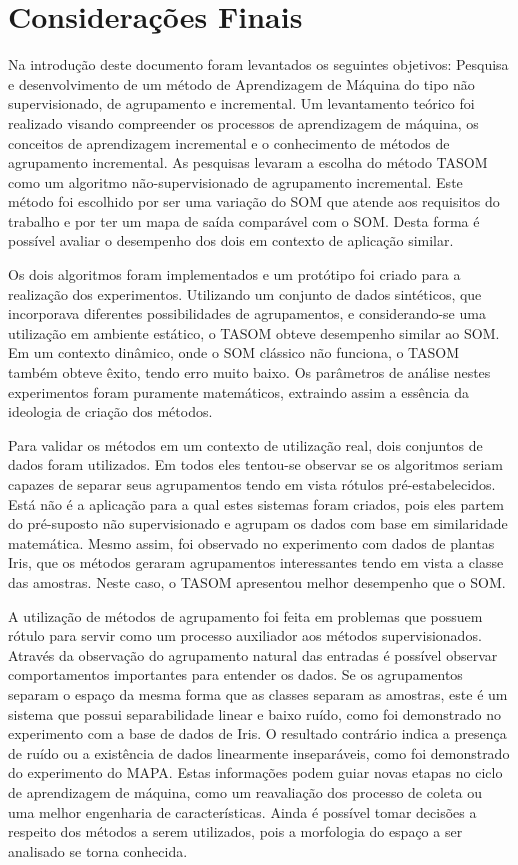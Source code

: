 \chapter{Considerações Finais}
Na introdução deste documento foram levantados os seguintes objetivos: Pesquisa e desenvolvimento de um método de Aprendizagem de Máquina do tipo não supervisionado, de agrupamento e incremental. Um levantamento teórico foi realizado visando compreender os processos de aprendizagem de máquina, os conceitos de aprendizagem incremental e o conhecimento de métodos de agrupamento incremental. As pesquisas levaram a escolha do método TASOM como um algoritmo não-supervisionado de agrupamento incremental. Este método foi escolhido por ser uma variação do SOM que atende aos requisitos do trabalho e por ter um mapa de saída comparável com o SOM. Desta forma é possível avaliar o desempenho dos dois em contexto de aplicação similar.

Os dois algoritmos foram implementados e um protótipo foi criado para a realização dos experimentos. Utilizando um conjunto de dados sintéticos, que incorporava diferentes possibilidades de agrupamentos, e considerando-se uma utilização em ambiente estático, o TASOM obteve desempenho similar ao SOM. Em um contexto dinâmico, onde o SOM clássico não funciona, o TASOM também obteve êxito, tendo erro muito baixo. Os parâmetros de análise nestes experimentos foram puramente matemáticos, extraindo assim a essência da ideologia de criação dos métodos.

Para validar os métodos em um contexto de utilização real, dois conjuntos de dados foram utilizados. Em todos eles tentou-se observar se os algoritmos seriam capazes de separar seus agrupamentos tendo em vista rótulos pré-estabelecidos. Está não é a aplicação para a qual estes sistemas foram criados, pois eles partem do pré-suposto não supervisionado e agrupam os dados com base em similaridade matemática. Mesmo assim, foi observado no experimento com dados de plantas Iris, que os métodos geraram agrupamentos interessantes tendo em vista a classe das amostras. Neste caso, o TASOM apresentou melhor desempenho que o SOM. 

A utilização de métodos de agrupamento foi feita em problemas que possuem rótulo para servir como um processo auxiliador aos métodos supervisionados. Através da observação do agrupamento natural das entradas é possível observar comportamentos importantes para entender os dados. Se os agrupamentos separam o espaço da mesma forma que as classes separam as amostras, este é um sistema que possui separabilidade linear e baixo ruído, como foi demonstrado no experimento com a base de dados de Iris. O resultado contrário indica a presença de ruído ou a existência de dados linearmente inseparáveis, como foi demonstrado do experimento do MAPA. Estas informações podem guiar novas etapas no ciclo de aprendizagem de máquina, como um reavaliação dos processo de coleta ou uma melhor engenharia de características. Ainda é possível tomar decisões a respeito dos métodos a serem utilizados, pois a morfologia do espaço a ser analisado se torna conhecida. 


